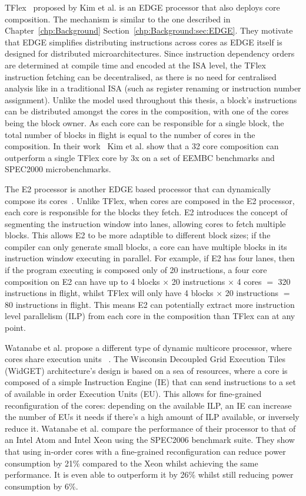 TFlex~\cite{kim2007tflex} proposed by Kim et al. is an EDGE processor that also deploys core composition.
The mechanism is similar to the one described in Chapter~\ref{chp:Background} Section~\ref{chp:Background:sec:EDGE}.
They motivate that EDGE simplifies distributing instructions across cores as EDGE itself is designed for distributed microarchitectures.
Since instruction dependency orders are determined at compile time and encoded at the ISA level, the TFlex instruction fetching can be decentralised, as there is no need for centralised analysis like in a traditional ISA (such as register renaming or instruction number assignment).
Unlike the model used throughout this thesis, a block's instructions can be distributed amongst the cores in the composition, with one of the cores being the block owner.
As each core can be responsible for a single block, the total number of blocks in flight is equal to the number of cores in the composition.
In their work~\cite{kim2007tflex} Kim et al. show that a 32 core composition can outperform a single TFlex core by 3x on a set of EEMBC benchmarks and SPEC2000 microbenchmarks.

The E2 processor is another EDGE based processor that can dynamically compose its cores~\cite{putnam2010e2}.
Unlike TFlex, when cores are composed in the E2 processor, each core is responsible for the blocks they fetch.
E2 introduces the concept of segmenting the instruction window into lanes, allowing cores to fetch multiple blocks.
This allows E2 to be more adaptible to different block sizes; if the compiler can only generate small blocks, a core can have multiple blocks in its instruction window executing in parallel.
For example, if E2 has four lanes, then if the program executing is composed only of 20 instructions, a four core composition on E2 can have up to 4 blocks $\times$ 20 instructions $\times$ 4 cores $=$ 320 instructions in flight, whilst TFlex will only have 4 blocks $\times$ 20 instructions $=$ 80 instructions in flight.
This means E2 can potentially extract more instruction level parallelism (ILP) from each core in the composition than TFlex can at any point.

Watanabe et al. propose a different type of dynamic multicore processor, where cores share execution units ~\cite{Watanabe2010Widget}.
The Wisconsin Decoupled Grid Execution Tiles (WidGET) architecture's design is based on a sea of resources, where a core is composed of a simple Instruction Engine (IE) that can send instructions to a set of available in order Execution Units (EU).
This allows for fine-grained reconfiguration of the cores: depending on the available ILP, an IE can increase the number of EUs it needs if there's a high amount of ILP available, or inversely reduce it.
Watanabe et al. compare the performance of their processor to that of an Intel Atom and Intel Xeon using the SPEC2006 benchmark suite.
They show that using in-order cores with a fine-grained reconfiguration can reduce power consumption by 21\% compared to the Xeon whilst achieving the same performance.
It is even able to outperform it by 26\% whilst still reducing power consumption by 6\%.

